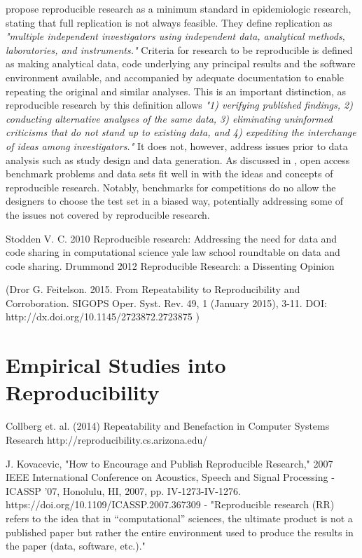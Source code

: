 \cite{Peng2006} propose reproducible research as a minimum standard in epidemiologic research, stating that full replication is not always feasible. They define replication as \emph{"multiple independent investigators using independent data, analytical methods, laboratories, and instruments."} Criteria for research to be reproducible is defined as making analytical data, code underlying any principal results and the software environment available, and accompanied by adequate documentation to enable repeating the original and similar analyses. This is an important distinction, as reproducible research by this definition allows \emph{"1) verifying published findings, 2) conducting alternative analyses of the same data, 3) eliminating uninformed criticisms that do not stand up to existing data, and 4) expediting the interchange of ideas among investigators."} \citep{Peng2006} It does not, however, address issues prior to data analysis such as study design and data generation. As discussed in \cite{Vandewalle2007}, open access benchmark problems and data sets fit well in with the ideas and concepts of reproducible research. Notably, benchmarks for competitions do no allow the designers to choose the test set in a biased way, potentially addressing some of the issues not covered by reproducible research.

Stodden V. C. 2010 Reproducible research: Addressing the need for data and code sharing in computational science yale law school roundtable on data and code sharing.
Drummond 2012 Reproducible Research: a Dissenting Opinion

(Dror G. Feitelson. 2015. From Repeatability to Reproducibility and Corroboration. SIGOPS Oper. Syst. Rev. 49, 1 (January 2015), 3-11. DOI: http://dx.doi.org/10.1145/2723872.2723875 )




\section{Empirical Studies into Reproducibility}
Collberg et. al. (2014) Repeatability and Benefaction in Computer Systems Research
http://reproducibility.cs.arizona.edu/

J. Kovacevic, "How to Encourage and Publish Reproducible Research," 2007 IEEE International Conference on Acoustics, Speech and Signal Processing - ICASSP '07, Honolulu, HI, 2007, pp. IV-1273-IV-1276. https://doi.org/10.1109/ICASSP.2007.367309
- "Reproducible research (RR) refers to the idea that in “computational” sciences, the ultimate product is not a published paper but rather the entire environment used to produce the results in the paper (data, software, etc.)."

